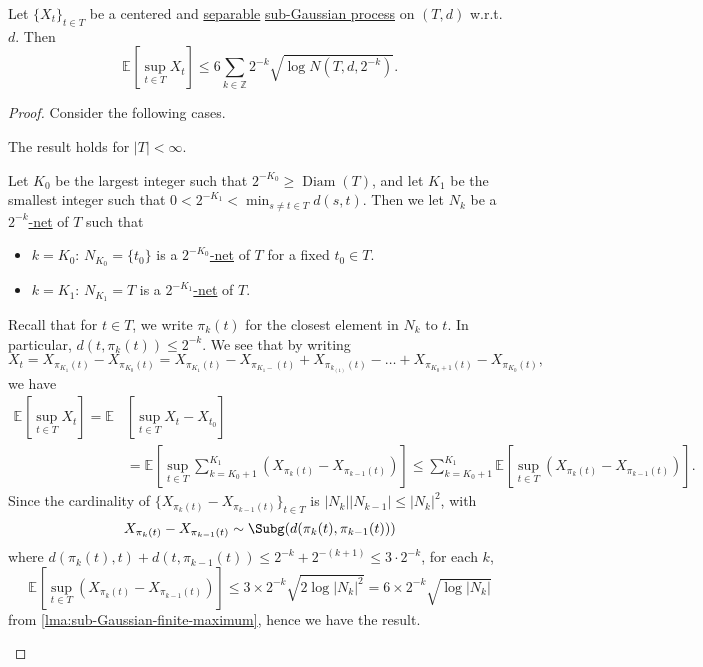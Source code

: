 \begin{theorem}\label{thm:Dudley-entropy-bound}
	Let \(\{ X_t \} _{t\in T}\) be a centered and \hyperref[def:separable]{separable} \hyperref[def:sub-Gaussian-process]{sub-Gaussian process} on \((T, d)\) w.r.t.\ \(d\). Then
	\[
		\mathbb{E}_{}\left[\sup _{t\in T} X_t \right] \leq 6 \sum_{k\in \mathbb{Z} } 2^{-k} \sqrt{\log N(T, d, 2^{-k})} .
	\]
\end{theorem}
\begin{proof}
	Consider the following cases.
	\begin{claim}
		The result holds for \(\vert T \vert < \infty \).
	\end{claim}
	\begin{explanation}
		Let \(K_0\) be the largest integer such that \(2^{-K_0} \geq \mathop{\mathrm{Diam}}(T) \), and let \(K_1\) be the smallest integer such that \(0 < 2^{-K_1} < \min _{s \neq t\in T} d(s, t)\). Then we let \(N_k\) be a \hyperref[def:eps-net]{\(2^{-k}\)-net} of \(T\) such that
		\begin{itemize}
			\item \(k = K_0\): \(N_{K_0} = \{ t_0 \} \) is a \hyperref[def:eps-net]{\(2^{-K_0}\)-net} of \(T\) for a fixed \(t_0\in T\).
			\item \(k = K_1\): \(N_{K_1} = T\) is a \hyperref[def:eps-net]{\(2^{-K_1}\)-net} of \(T\).
		\end{itemize}
		Recall that for \(t\in T\), we write \(\pi _k(t)\) for the closest element in \(N_k\) to \(t\). In particular, \(d(t, \pi _k(t)) \leq 2^{-k}\). We see that by writing
		\[
			X_t
			= X_{\pi _{K_1} (t)} - X_{\pi _{K_0} (t)}
			= X_{\pi _{K_1}(t)} - X_{\pi _{K_1 - } (t)} + X_{\pi _{k_{(1)}} (t)} - \dots + X_{\pi _{K_0 + 1} (t)} - X_{\pi _{K_0} (t)},
		\]
		we have
		\[
			\begin{split}
				\mathbb{E}_{}\left[\sup _{t\in T} X_t \right]
				= \mathbb{E}_{}&\left[\sup _{t\in T} X_t - X_{t_0} \right]\\
				&= \mathbb{E}_{}\left[\sup _{t\in T} \sum_{k=K_0 + 1}^{K_1} \left( X_{\pi _k (t)} - X_{\pi _{k-1}(t)} \right) \right]
				\leq \sum_{k=K_0 + 1}^{K_1} \mathbb{E}_{}\left[\sup _{t\in T} \left( X_{\pi _k(t)} - X_{\pi _{k-1} (t)} \right) \right].
			\end{split}
		\]
		Since the cardinality of \(\{ X_{\pi _k(t)} - X_{\pi _{k-1} (t)} \}_{t\in T}\) is \(\vert N_k \vert \vert N_{k-1} \vert \leq \vert N_k \vert ^2\), with
		\[
			X_{\pi _k(t)} - X_{\pi _{k-1}(t)} \sim \Subg(d(\pi _k(t), \pi _{k-1}(t)))
		\]
		where \(d(\pi _k(t), t) + d(t, \pi _{k-1}(t)) \leq 2^{-k} + 2^{-(k+1)} \leq 3\cdot 2^{-k}\), for each \(k\),
		\[
			\mathbb{E}_{}\left[\sup _{t\in T} \left( X_{\pi _k(t)} - X_{\pi _{k-1}(t)} \right) \right]
			\leq 3 \times 2^{-k} \sqrt{2 \log \vert N_k \vert ^2}
			= 6 \times 2^{-k} \sqrt{\log \vert N_k \vert }
		\]
		from \autoref{lma:sub-Gaussian-finite-maximum}, hence we have the result.
	\end{explanation}


\end{proof}
